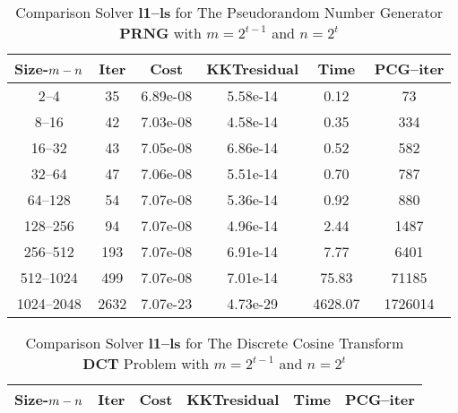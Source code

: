 \documentclass[letterpaper,12pt,oneside,final]{book}
\begin{document}
\begin{table}
\caption{Comparison Solver  {\bf l1--ls} for  The  Pseudorandom Number Generator {\bf PRNG} with $m=2^{t-1}$ and $n=2^{t}$} 
\begin{center}
\begin{tabular}{|*{6}{c}|} \hline
Size-$m\--n$ & \multicolumn{1}{c}{Iter} & \multicolumn{1}{c}{Cost}& \multicolumn{1}{c}{KKTresidual} & \multicolumn{1}{c}{Time} & \multicolumn{1}{c|}{PCG--iter} \\ 
\hline
2--4    &35    &6.89e-08    &5.58e-14    &0.12    &73 \\
8--16    &42    &7.03e-08    &4.58e-14    &0.35    &334\\ 
16--32    &43    &7.05e-08    &6.86e-14    &0.52    &582\\ 
32--64    &47    &7.06e-08    &5.51e-14    &0.70    &787 \\
64--128    &54    &7.07e-08    &5.36e-14    &0.92    &880 \\
128--256    &94    &7.07e-08    &4.96e-14    &2.44    &1487\\ 
256--512    &193    &7.07e-08    &6.91e-14    &7.77    &6401\\ 
512--1024    &499    &7.07e-08    &7.01e-14    &75.83    &71185\\ 
1024--2048    &2632     &7.07e-23    &4.73e-29    &4628.07    &1726014\\
\hline
\end{tabular}
\end{center}
\end{table}


\begin{table}
\caption{Comparison Solver  {\bf l1--ls}  for  The Discrete Cosine Transform {\bf DCT} Problem with  $m=2^{t-1}$ and $n=2^{t}$} 
\begin{center}
\begin{tabular}{|*{6}{c}|} \hline
Size-$m\--n$ & \multicolumn{1}{c}{Iter} & \multicolumn{1}{c}{Cost}& \multicolumn{1}{c}{KKTresidual} & \multicolumn{1}{c}{Time} & \multicolumn{1}{c|}{PCG--iter} \\ 
\hline

\hline
\end{tabular}
\end{center}
\end{table}
\end{document}
